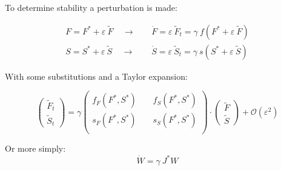 \documentclass{beamer}
\begin{document}
            \begin{frame}{\insertsubsectionhead}
            
                To determine stability a perturbation is made:
        
                \begin{equation*}
                    \begin{aligned}
                    F = F^*+\varepsilon~\tilde{F} ~~~~~\longrightarrow~~~~~& \dot{F} = \varepsilon~\tilde{F}_t = \gamma~f(F^*+\varepsilon~\tilde{F})\\
                    S = S^*+\varepsilon~\tilde{S} ~~~~~\longrightarrow~~~~~& \dot{S} = \varepsilon~\tilde{S}_t = \gamma~s(S^*+\varepsilon~\tilde{S})
                    \end{aligned}
                \end{equation*}
                
                With some substitutions and a Taylor expansion:
                
                \begin{equation*}
                    \left(\begin{aligned}
                    \tilde{F}_t \\
                    \tilde{S}_t
                \end{aligned}\right)
                =
                \gamma\left(\begin{aligned}
                    f_F(F^*,S^*) ~~~~~& f_S(F^*,S^*)\\
                    s_F(F^*,S^*) ~~~~~& s_S(F^*,S^*) \\
                \end{aligned}\right)
                \cdot
                \left(\begin{aligned}
                    \tilde{F} \\
                    \tilde{S}
                \end{aligned}\right)
                + \mathcal{O}(\varepsilon^2)
                \end{equation*}
                
                Or more simply:
                \Huge$$\dot{W}=\gamma~J^*W$$
                
                \vfill
                
            \end{frame}
            
\end{document}
